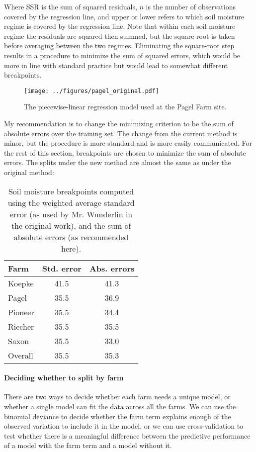 \documentclass[11pt]{article}
\begin{document}
Where SSR is the sum of squared residuals, $n$ is the number of observations covered by the regression line, and upper or lower refers to which soil moisture regime is covered by the regression line. Note that within each soil moisture regime the residuals are squared then summed, but the square root is taken before averaging between the two regimes. Eliminating the square-root step results in a procedure to minimize the sum of squared errors, which would be more in line with standard practice but would lead to somewhat different breakpoints.\*

\begin{figure}[h!]
\centering
\texttt{[image: ../figures/pagel\_original.pdf]}
\caption{The piecewise-linear regression model used at the Pagel Farm site.\label{piecewise_pagel}}
\end{figure}

My recommendation is to change the minimizing criterion to be the sum of absolute errors over the training set. The change from the current method is minor, but the procedure is more standard and is more easily communicated. For the rest of this section, breakpoints are chosen to minimize the sum of absolute errors. The splits under the new method are almost the same as under the original method:\*

\begin{table}
\centering
\linespread{1}
\begin{tabular}{l c c}
	Farm	 & Std. error & Abs. errors \\
	\hline
	Koepke & 41.5 & 41.3 \\
	Pagel & 35.5 & 36.9 \\
	Pioneer & 35.5 & 34.4 \\
	Riecher & 35.5 & 35.5 \\
	Saxon & 35.5 & 33.0 \\
	\hline
	Overall & 35.5 & 35.3
\end{tabular}
\caption{Soil moisture breakpoints computed using the weighted average standard error (as used by Mr. Wunderlin in the original work), and the sum of absolute errors (as recommended here). \label{breakpoints}}
\linespread{2}
\end{table}
\*

\paragraph{Deciding whether to split by farm}
There are two ways to decide whether each farm needs a unique model, or whether a single model can fit the data across all the farms. We can use the binomial deviance to decide whether the farm term explains enough of the observed variation to include it in the model, or we can use cross-validation to test whether there is a meaningful difference between the predictive performance of a model with the farm term and a model without it.\*
\end{document}

